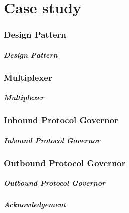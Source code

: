 \documentclass[t,dvipsnames]{beamer}
\begin{document}
\part{Case study}
\frame{
  \partpage
  \tableofcontents[part=2]
}

\section{Design Pattern}

\begin{frame}
  \frametitle{Design Pattern}
\end{frame}

\section{Multiplexer}

\begin{frame}
  \frametitle{Multiplexer}
\end{frame}

\section{Inbound Protocol Governor}

\begin{frame}
  \frametitle{Inbound Protocol Governor}
\end{frame}

\section{Outbound Protocol Governor}

\begin{frame}
  \frametitle{Outbound Protocol Governor}
\end{frame}


\begin{frame}
  \frametitle{Acknowledgement}
\end{frame}
\end{document}
